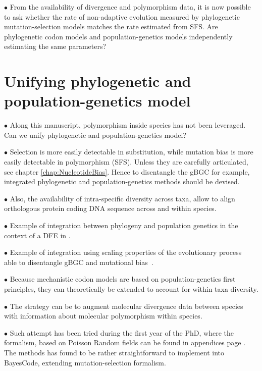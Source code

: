 $\bullet$ From the availability of divergence and polymorphism data, it is now possible to ask whether the rate of non-adaptive evolution measured by phylogenetic mutation-selection models matches the rate estimated from \acrshort{SFS}.
Are phylogenetic \gls{codon} models and population-genetics models independently estimating the same parameters?

\section{Unifying phylogenetic and population-genetics model}
\label{sec:unifying-phylogenetic-and-population-genetics-model}

$\bullet$ Along this manuscript, polymorphism inside species has not been leveraged. Can we unify phylogenetic and population-genetics model?

$\bullet$ Selection is more easily detectable in \gls{substitution}, while mutation bias is more easily detectable in polymorphism (\acrshort{SFS}).
Unless they are carefully articulated, see chapter \ref{chap:NucleotideBias}.
Hence to disentangle the gBGC for example, integrated phylogenetic and population-genetics methods should be devised.

$\bullet$ Also, the availability of intra-specific diversity across taxa, allow to align orthologous protein coding \acrshort{DNA} sequence across and within species.

$\bullet$ Example of integration between phylogeny and population genetics in the context of a \acrshort{DFE} in \citet{Wilson2011}.

$\bullet$ Example of integration using scaling properties of the evolutionary process~\citep{DeMaio2013, Schrempf2016, Bergman2018, Schrempf2019} able to disentangle gBGC and mutational bias~\citep{Borges2019, Borges2020}.

$\bullet$ Because mechanistic \gls{codon} models are based on population-genetics first principles, they can theoretically be extended to account for within taxa diversity.

$\bullet$ The strategy can be to augment molecular divergence data between species with information about molecular polymorphism within species.

$\bullet$ Such attempt has been tried during the first year of the PhD, where the formalism, based on Poisson Random fields can be found in appendices page \pageref{sec-appendix:PRF}.
The methods has found to be rather straightforward to implement into BayesCode, extending mutation-selection formalism.

